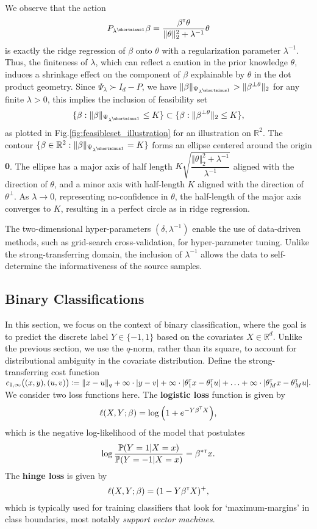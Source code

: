 \documentclass[12pt]{article}
\begin{document}
We observe that the action \[P_{\lambda^{\shortminus 1}} \beta = \dfrac{\beta\trans\theta}{\Vert\theta\Vert_2^2+\lambda^{-1}}\theta\] is exactly the ridge regression of $\beta$ onto $\theta$ with a regularization parameter $\lambda^{-1}$. Thus, the finiteness of $\lambda$, which can reflect a caution in the prior knowledge $\theta$, induces a shrinkage effect on the component of $\beta$ explainable by $\theta$ in the dot product geometry. Since $\Psi_\lambda \succ I_d-P$, we have $\Vert\beta\Vert_{\Psi_{\lambda^{\shortminus 1}}} > \Vert\beta^{\perp\theta}\Vert_2$ for any finite $\lambda > 0$, this implies the inclusion of feasibility set \[\{\beta: \Vert\beta\Vert_{\Psi_{\lambda^{\shortminus 1}}}\leq K\} \subset \{\beta:\Vert\beta^{\perp\theta}\Vert_2\leq K\},\] as plotted in Fig.\ref{fig:feasibleset_illustration} for an illustration on $\mathbb{R}^2$. The contour $\{\beta \in \mathbb{R}^2:\Vert\beta\Vert_{\Psi_{\lambda^{\shortminus 1}}} = K\}$ forms an ellipse centered around the origin $\boldsymbol{0}$. The ellipse has a major axis of half length $K\sqrt{\dfrac{\Vert\theta\Vert_2^2+\lambda^{-1}}{\lambda^{-1}}}$ aligned with the direction of $\theta$, and a minor axis with half-length $K$ aligned with the direction of $\theta^\perp$. As $\lambda \to 0$, representing no-confidence in $\theta$, the half-length of the major axis converges to $K$, resulting in a perfect circle as in ridge regression.

The two-dimensional hyper-parameters $(\delta, \lambda^{- 1})$ enable the use of data-driven methods, such as grid-search cross-validation, for hyper-parameter tuning. Unlike the strong-transferring domain, the inclusion of $\lambda^{- 1}$ allows the data to self-determine the informativeness of the source samples. 


\subsection{Binary Classifications}
In this section, we focus on the context of binary classification, where the goal is to predict the discrete label $Y \in \{-1, 1\}$ based on the covariates $X \in \mathbb{R}^d$. Unlike the previous section, we use the $q$-norm, rather than its square, to account for distributional ambiguity in the covariate distribution. Define the strong-transferring cost function $c_{1,\infty}\big((x,y),(u,v)\big) \coloneqq \Vert x-u\Vert_q + \infty\cdot|y-v| + \infty\cdot|\theta_1^{\scriptscriptstyle \sf T} x - \theta_1^{\scriptscriptstyle \sf T} u| + \ldots +\infty \cdot |\theta_M^{\scriptscriptstyle \sf T} x - \theta_M^{\scriptscriptstyle \sf T} u|.$ We consider two loss functions here. The \textbf{logistic loss} function is given by \[
\ell(X,Y;\beta) = \log{\left(1+e^{-Y\beta^{\scriptscriptstyle \sf T}X} \right)},
\]which is the negative log-likelihood of the model that postulates\[
\log{\dfrac{\mathbb{P}(Y=1|X=x)}{\mathbb{P}(Y=-1|X=x)}} = \beta^{*}{^{\scriptscriptstyle \sf T}}x.
\]The \textbf{hinge loss} is given by \[
\ell{(X,Y;\beta)} = (1-Y\beta^{\scriptscriptstyle \sf T} X)^+,
\]which is typically used for training classifiers that look for `maximum-margins' in class boundaries, most notably \textit{support vector machines}.
\end{document}
